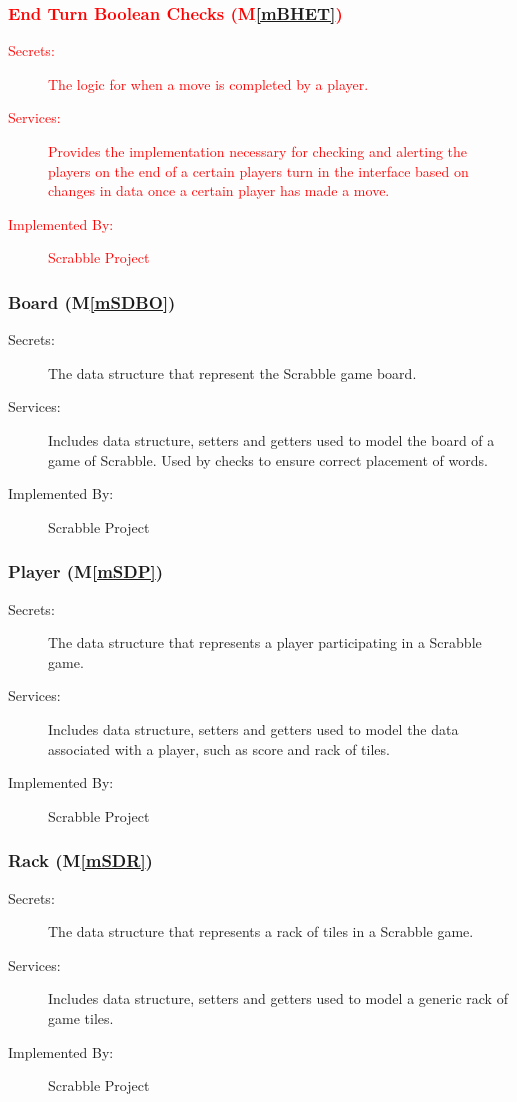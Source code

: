 \documentclass[12pt, titlepage]{article}
\newcommand{\mref}[1]{M\ref{#1}}
\begin{document}
\textcolor{red}{\subsubsection{End Turn Boolean Checks (\mref{mBHET})}
\begin{description}
\item [Secrets:] The logic for when a move is completed by a player.
\item [Services:] Provides the implementation necessary for checking and alerting the players on the end of a certain players turn in the interface based on changes in data once a certain player has made a move.
\item [Implemented By:] Scrabble Project
\end{description}}

\subsubsection{Board (\mref{mSDBO})}
\begin{description}
\item[Secrets:] The data structure that represent the Scrabble game board.
\item[Services:] Includes data structure, setters and getters used to model the board of a game of Scrabble. Used by checks to ensure correct placement of words.
\item[Implemented By:] Scrabble Project
\end{description}

\subsubsection{Player (\mref{mSDP})}
\begin{description}
\item[Secrets:] The data structure that represents a player participating in a Scrabble game.
\item[Services:] Includes data structure, setters and getters used to model the data associated with a player, such as score and rack of tiles.
\item[Implemented By:] Scrabble Project
\end{description}

\subsubsection{Rack (\mref{mSDR})}
\begin{description}
\item[Secrets:] The data structure that represents a rack of tiles in a Scrabble game.
\item[Services:] Includes data structure, setters and getters used to model a generic rack of game tiles. 
\item[Implemented By:] Scrabble Project
\end{description}
\end{document}
